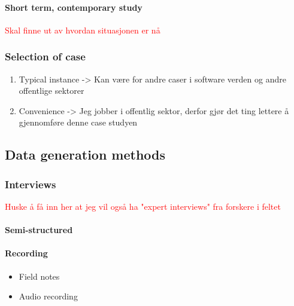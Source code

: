 \paragraph{Short term, contemporary study} \textcolor{red}{Skal finne ut av hvordan situasjonen er nå}

\subsubsection{Selection of case}
\begin{enumerate}
    \item Typical instance -> Kan være for andre caser i software verden og andre offentlige sektorer
    \item Convenience -> Jeg jobber i offentlig sektor, derfor gjør det ting lettere å gjennomføre denne case studyen
\end{enumerate}

\subsection{Data generation methods}

\subsubsection{Interviews}

\textcolor{red}{Huske å få inn her at jeg vil også ha "expert interviews" fra forskere i feltet}

\paragraph{Semi-structured}

\paragraph{Recording}
\begin{itemize}
    \item Field notes
    \item Audio recording
\end{itemize}


